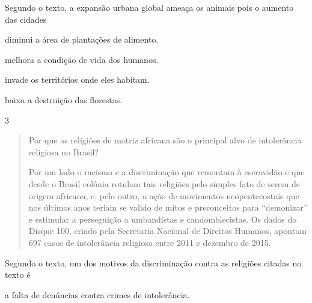 \begin{itemize}
\begin{itemize}
\begin{itemize}
\begin{itemize}
{{\begin{itemize}
\begin{itemize}
Segundo o texto, a expansão urbana global ameaça os animais pois o
aumento das cidades

\begin{escolha}
\item diminui a área de plantações de alimento.

\item melhora a condição de vida dos humanos.

\item invade os territórios onde eles habitam.

\item baixa a destruição das florestas.
\end{escolha}


\num{3}

\begin{quote}
Por que as religiões de matriz africana são o principal alvo de
intolerância religiosa no Brasil?

Por um lado o racismo e a discriminação que remontam à escravidão e que
desde o Brasil colônia rotulam tais religiões pelo simples fato de serem
de origem africana, e, pelo outro, a ação de movimentos neopentecostais
que nos últimos anos teriam se valido de mitos e preconceitos para
``demonizar'' e estimular a perseguição a umbandistas e candomblecistas.
Os dados do Disque 100, criado pela Secretaria Nacional de Direitos
Humanos, apontam 697 casos de intolerância religiosa entre 2011 e
dezembro de 2015.
\end{quote}

Segundo o texto, um dos motivos da discriminação contra as religiões
citadas no texto é

\begin{escolha}
\item a falta de denúncias contra crimes de intolerância.


\end{escolha}
\end{itemize}
\end{itemize}}}
\end{itemize}
\end{itemize}
\end{itemize}
\end{itemize}
